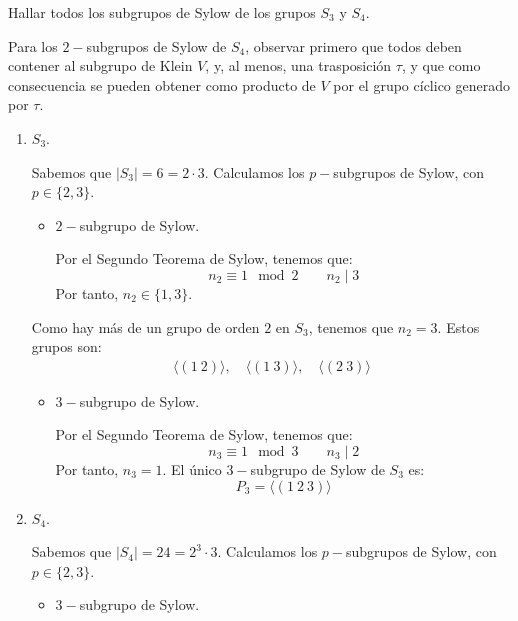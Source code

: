 \begin{ejercicio}\label{ej:6.20}
    Hallar todos los subgrupos de Sylow de los grupos $S_3$ y $S_4$.
    \begin{observacion}
        Para los $2-$subgrupos de Sylow de $S_4$, observar primero que todos deben contener al subgrupo de Klein $V$, y, al menos, una trasposición $\tau$, y que como consecuencia se pueden obtener como producto de $V$ por el grupo cíclico generado por $\tau$.
    \end{observacion}
    \begin{enumerate}
        \item $S_3$.
        
        Sabemos que $|S_3|=6=2\cdot 3$. Calculamos los $p-$subgrupos de Sylow, con $p\in \{2,3\}$.
        \begin{itemize}
            \item $2-$subgrupo de Sylow.
            
            Por el Segundo Teorema de Sylow, tenemos que:
            \begin{equation*}
                n_2 \equiv 1 \mod 2 \qquad n_2 \mid 3
            \end{equation*}
            Por tanto, $n_2\in \{1,3\}$.
        \end{itemize}
        Como hay más de un grupo de orden $2$ en $S_3$, tenemos que $n_2=3$. Estos grupos son:
        \begin{align*}
            \langle (1\ 2) \rangle, \quad \langle (1\ 3) \rangle, \quad \langle (2\ 3) \rangle
        \end{align*}
        \begin{itemize}
            \item $3-$subgrupo de Sylow.
            
            Por el Segundo Teorema de Sylow, tenemos que:
            \begin{equation*}
                n_3 \equiv 1 \mod 3 \qquad n_3 \mid 2
            \end{equation*}
            Por tanto, $n_3=1$. El único $3-$subgrupo de Sylow de $S_3$ es:
            \begin{equation*}
                P_3 = \langle (1\ 2\ 3) \rangle
            \end{equation*}
        \end{itemize}

        \item $S_4$.
        
        Sabemos que $|S_4|=24=2^3\cdot 3$. Calculamos los $p-$subgrupos de Sylow, con $p\in \{2,3\}$.
        \begin{itemize}
            \item $3-$subgrupo de Sylow.
            

\end{itemize}
\end{enumerate}
\end{ejercicio}

